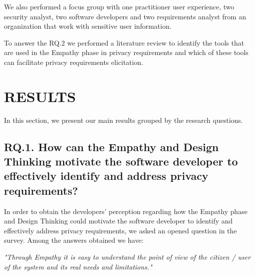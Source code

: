 \documentclass[conference]{IEEEtran}
\begin{document}

We also performed a focus group \cite{DBLP:conf/isese/KontioLB04} with one practitioner user experience, two security analyst, two software developers and two requirements analyst from an organization that work with sensitive user information.


To answer the RQ.2 we performed a literature review to identify the tools that are used in the Empathy phase in privacy requirements and which of these tools can facilitate privacy requirements elicitation.

\section{RESULTS}
\label{result}

In this section, we present our main results grouped by the research questions.

\subsection{RQ.1. How can the Empathy and Design Thinking motivate the software developer to effectively identify and address privacy requirements?}


In order to obtain the developers' perception regarding how the Empathy phase and Design Thinking could motivate the software developer to identify and effectively address privacy requirements, we asked an opened question in the survey. Among the answers obtained we have:

\begin{mq}
\emph{"Through Empathy it is easy to understand the point of view of the citizen / user of the system and its real needs and limitations."}
\end{mq}
\end{document}
